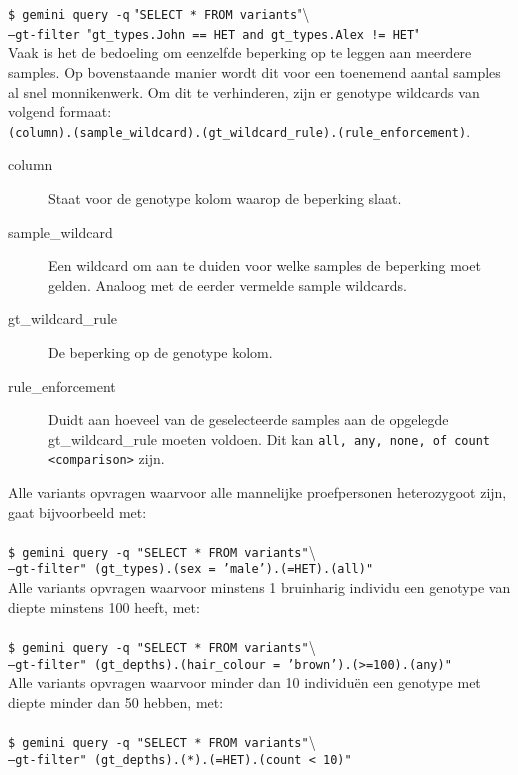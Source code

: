 \noindent\texttt{\$ gemini query -q} "\texttt{SELECT * FROM variants}"\textbackslash \\\texttt{--gt-filter }"\texttt{gt\_types.John == HET and gt\_types.Alex != HET}"\\

\noindent Vaak is het de bedoeling om eenzelfde beperking op te leggen aan meerdere samples. Op bovenstaande manier wordt dit voor een toenemend aantal samples al snel monnikenwerk. Om dit te verhinderen, zijn er genotype wildcards van volgend formaat:\\ 
\texttt{(column).(sample\_wildcard).(gt\_wildcard\_rule).(rule\_enforcement)}.
\begin{description}
\item[column] Staat voor de genotype kolom waarop de beperking slaat.
\item[sample\_wildcard] Een wildcard om aan te duiden voor welke samples de beperking moet gelden. Analoog met de eerder vermelde sample wildcards.
\item[gt\_wildcard\_rule] De beperking op de genotype kolom.
\item[rule\_enforcement] Duidt aan hoeveel van de geselecteerde samples aan de opgelegde gt\_wildcard\_rule moeten voldoen. Dit kan \texttt{all, any, none, of count <comparison>} zijn.
\end{description}

\noindent Alle variants opvragen waarvoor alle mannelijke proefpersonen heterozygoot zijn, gaat bijvoorbeeld met:\\\\
\texttt{\$ gemini query -q "}\texttt{SELECT * FROM variants"}\textbackslash \\
\texttt{--gt-filter" }\texttt{(gt\_types).(sex = 'male').(=HET).(all)"}\\

\noindent Alle variants opvragen waarvoor minstens 1 bruinharig individu een genotype van diepte minstens 100 heeft, met:\\\\
\texttt{\$ gemini query -q "}\texttt{SELECT * FROM variants"}\textbackslash \\
\texttt{--gt-filter" }\texttt{(gt\_depths).(hair\_colour = 'brown').(>=100).(any)"}\\

\noindent Alle variants opvragen waarvoor minder dan 10 individu\"en een genotype met diepte minder dan 50 hebben, met:\\\\
\texttt{\$ gemini query -q "}\texttt{SELECT * FROM variants"}\textbackslash \\
\texttt{--gt-filter" }\texttt{(gt\_depths).(*).(=HET).(count < 10)"}\\


